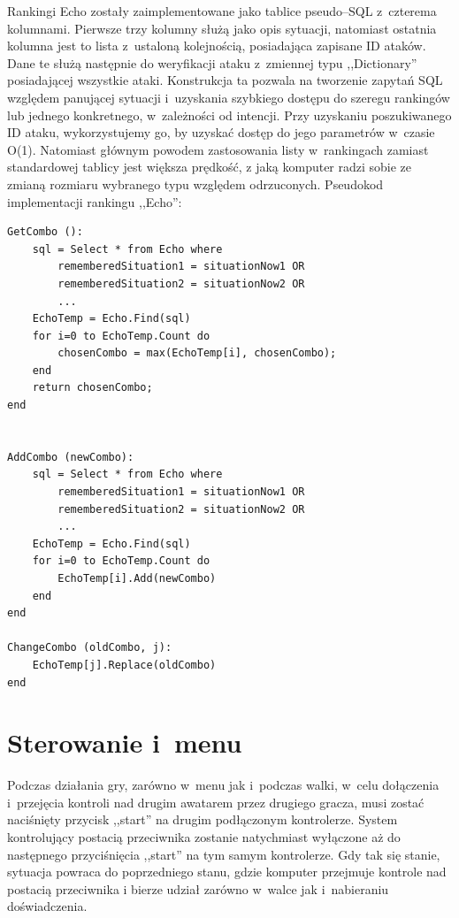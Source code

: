 \documentclass[brudnopis]{xmgr}
\begin{document}
Rankingi Echo zostały zaimplementowane jako tablice pseudo--SQL z~czterema
kolumnami. Pierwsze trzy kolumny służą jako opis sytuacji, natomiast
ostatnia kolumna jest to lista z~ustaloną kolejnością,
posiadająca zapisane ID ataków. Dane te służą następnie do weryfikacji
ataku z~zmiennej typu ,,Dictionary'' posiadającej wszystkie ataki.
Konstrukcja ta pozwala na tworzenie zapytań SQL względem
panującej sytuacji i~uzyskania szybkiego dostępu do szeregu rankingów lub
jednego konkretnego, w~zależności od intencji. Przy uzyskaniu
poszukiwanego ID ataku, wykorzystujemy go, by uzyskać dostęp
do jego parametrów w~czasie O(1). Natomiast głównym powodem zastosowania
listy w~rankingach zamiast standardowej tablicy jest większa prędkość, z
jaką komputer radzi sobie ze zmianą rozmiaru wybranego typu względem
odrzuconych.
Pseudokod implementacji rankingu ,,Echo'':
\begin{verbatim}
GetCombo ():
	sql = Select * from Echo where
		rememberedSituation1 = situationNow1 OR
		rememberedSituation2 = situationNow2 OR
		...
	EchoTemp = Echo.Find(sql)
	for i=0 to EchoTemp.Count do
		chosenCombo = max(EchoTemp[i], chosenCombo);
	end
	return chosenCombo;
end


AddCombo (newCombo):
	sql = Select * from Echo where
		rememberedSituation1 = situationNow1 OR
		rememberedSituation2 = situationNow2 OR
		...
	EchoTemp = Echo.Find(sql)
	for i=0 to EchoTemp.Count do
		EchoTemp[i].Add(newCombo)
	end
end

ChangeCombo (oldCombo, j):
	EchoTemp[j].Replace(oldCombo)
end
\end{verbatim}
\section{Sterowanie i~menu}
Podczas działania gry, zarówno w~menu jak i~podczas walki, w~celu
dołączenia i~przejęcia kontroli nad drugim awatarem przez drugiego
gracza, musi zostać naciśnięty przycisk ,,start'' na drugim podłączonym
kontrolerze. System kontrolujący postacią przeciwnika zostanie natychmiast wyłączone aż do następnego
przyciśnięcia ,,start'' na tym samym kontrolerze. Gdy tak się stanie,
sytuacja powraca do poprzedniego stanu, gdzie komputer przejmuje kontrole nad postacią przeciwnika i
bierze udział zarówno w~walce jak i~nabieraniu doświadczenia.
\end{document}
